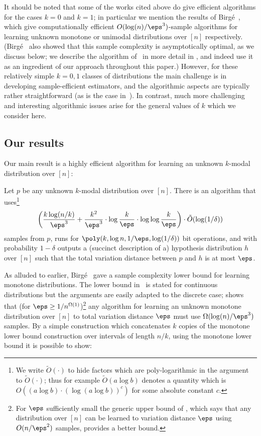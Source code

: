 It should be noted that some of the works cited above 
do give efficient algorithms for the cases $k=0$ and $k=1$; 
in particular we mention the results of Birg\'{e}~\cite{Birge:87b,Birge:97}, 
which give computationally efficient $O(\log(n)/\eps^3)$-sample algorithms 
for learning unknown monotone or unimodal distributions over $[n]$ 
respectively.
(Birg\'{e}~\cite{Birge:87} also showed that this sample
complexity is asymptotically optimal, as we discuss below; we describe 
the algorithm of~\cite{Birge:87b} in more detail
in , and indeed use it as an ingredient of our 
approach throughout this paper.)  
However, for these relatively simple $k=0,1$ classes of distributions the 
main challenge is in developing sample-efficient estimators, and the 
algorithmic aspects are typically rather straightforward (as is the case 
in~\cite{Birge:87b}).  In contrast, much more challenging and interesting 
algorithmic issues arise for the general values of $k$ which we consider here.

\subsection{Our results}


Our main result is a highly efficient algorithm for learning an unknown
$k$-modal distribution over $[n]$:


\begin{theorem} \label{thm:main}
Let $p$ be any unknown $k$-modal distribution over $[n]$.  There is an algorithm that uses\footnote{We
write $\tilde{O}(\cdot)$ to hide factors which are poly-logarithmic
in the argument to $\tilde{O}(\cdot)$;
thus for example $\tilde{O}(a \log b)$ denotes a quantity
which is $O((a \log b) \cdot  (\log (a \log b))^c)$ for some
absolute constant $c$.}
%
\[
\left ( {\frac {k\log(n/k)}{\eps^3}}  +   \frac{ {k^2}}{\eps^3} \cdot \log {\frac k \eps} \cdot
\log\log {\frac k \eps} \right )
\cdot \tilde{O}(\log(1/\delta))
\]
%
samples from $p$, runs for $\poly(k, \log n, 1/\eps,\log(1/\delta))$
bit operations, and with probability $1-\delta$ outputs a (succinct description of a) hypothesis
distribution $h$ over $[n]$ such that the total variation distance between $p$ and $h$ is
at most $\eps$.
\end{theorem}

%

As alluded to earlier, Birg\'{e}~\cite{Birge:87} gave a sample complexity lower bound
for learning monotone distributions. The lower bound in~\cite{Birge:87} is stated for continuous
distributions but the arguments are easily adapted to the discrete case; \cite{Birge:87} shows that
(for $\eps \geq 1/n^{\Omega(1)}$)\footnote{For $\eps$ sufficiently small the generic
upper bound of  {}, which says that any distribution over $[n]$
can be learned to variation distance $\eps$ using $O(n/\eps^2)$ samples, provides a
better bound.} any algorithm for learning an unknown monotone distribution over $[n]$ to
total variation distance $\eps$ must use $\Omega(\log(n)/\eps^3)$ samples.
By a simple construction which concatenates $k$ copies of the monotone lower bound construction over intervals
of length $n/k$, using the monotone lower bound it is possible to show:

